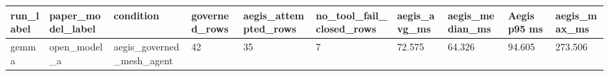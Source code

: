\begin{tabular}{llllllllll}
 \hline
run\_label & paper\_model\_label & condition & governed\_rows & aegis\_attempted\_rows & no\_tool\_fail\_closed\_rows & aegis\_avg\_ms & aegis\_median\_ms & Aegis p95 ms & aegis\_max\_ms \\
 \hline
gemma & open\_model\_a & aegis\_governed\_mesh\_agent & 42 & 35 & 7 & 72.575 & 64.326 & 94.605 & 273.506 \\
 \hline
\end{tabular}
